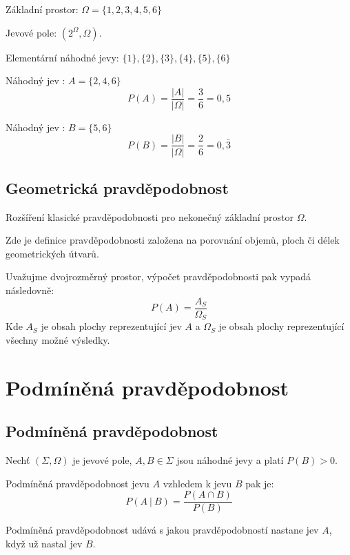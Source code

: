 \begin{compactitem}
    \item Základní prostor: $\Omega = \{ 1, 2, 3, 4, 5, 6 \}$
    \item Jevové pole: $(2^{\Omega}, \Omega)$.
    \item Elementární náhodné jevy: $ \{1\}, \{2\}, \{3\}, \{4\}, \{5\}, \{6\} $
    \item Náhodný jev : $A = \{ 2, 4, 6 \}$
    $$ P(A) = \frac{|A|}{|\Omega|} = \frac{3}{6} = 0,5 $$
    \item Náhodný jev : $B = \{ 5, 6 \}$
    $$ P(B) = \frac{|B|}{|\Omega|} = \frac{2}{6} = 0,\bar{3} $$
\end{compactitem}

\subsection{Geometrická pravděpodobnost}

\begin{compactitem}
    \item Rozšíření klasické pravděpodobnosti pro nekonečný základní prostor $\Omega$.

    \item Zde je definice pravděpodobnosti založena na porovnání objemů, ploch či délek geometrických útvarů.

    \item Uvažujme dvojrozměrný prostor, výpočet pravděpodobnosti pak vypadá následovně:
    $$ P(A) = \frac{A_S}{\Omega_S}$$
    Kde $A_S$ je obsah plochy reprezentující jev $A$ a $\Omega_S$ je obsah plochy reprezentující všechny možné výsledky.
\end{compactitem}


\section{Podmíněná pravděpodobnost}

\subsection{Podmíněná pravděpodobnost}

\begin{compactitem}
    \item Nechť $(\Sigma, \Omega)$ je jevové pole, $A, B \in \Sigma$ jsou náhodné jevy a platí $P(B) > 0$.

    \item Podmíněná pravděpodobnost jevu $A$ vzhledem k jevu $B$ pak je:
    $$ P(A ~|~ B) = \frac{P(A \cap B)}{P(B)} $$

    \item Podmíněná pravděpodobnost udává s jakou pravděpodobností nastane jev $A$, když už nastal jev $B$.
\end{compactitem}

